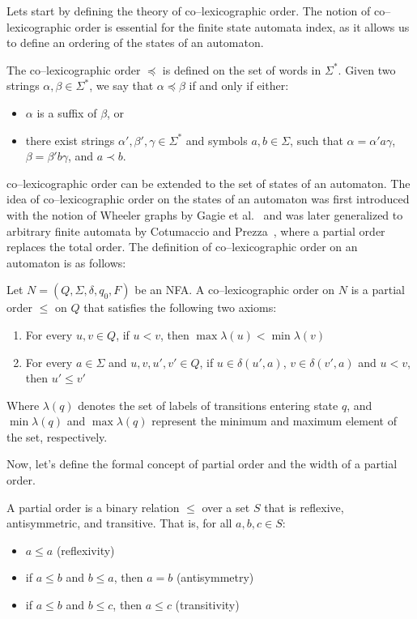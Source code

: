 Lets start by defining the theory of co--lexicographic order. The notion of co--lexicographic order is essential for the finite state automata index, as it allows us to define an ordering of the states of an automaton. 
\begin{definition} 
    The co--lexicographic order $\preceq$ is defined on the set of words in $\Sigma^*$. Given two strings $\alpha, \beta \in \Sigma^*$, we say that $\alpha \preceq \beta$ if and only if either:
    \begin{itemize}
        \item $\alpha$ is a suffix of $\beta$, or
        \item there exist strings $\alpha', \beta', \gamma \in \Sigma^*$ and symbols $a, b \in \Sigma$, such that $\alpha = \alpha'a\gamma$, $\beta = \beta'b\gamma$, and $a \prec b$.
    \end{itemize}
\end{definition}
co--lexicographic order can be extended to the set of states of an automaton. The idea of co--lexicographic order on the states of an automaton was first introduced with the notion of Wheeler graphs by Gagie et al.~\cite{gagie2017wheeler} and was later generalized to arbitrary finite automata by Cotumaccio and Prezza~\cite{cotumaccio2021indexing}, where a partial order replaces the total order. The definition of co--lexicographic order on an automaton is as follows:

\begin{definition} \label{def:colex_order_on_automaton}
    Let $N = (Q, \Sigma, \delta, q_0, F)$ be an NFA. A co--lexicographic order on $N$ is a partial order $\leq$ on $Q$ that satisfies the following two axioms:
    \begin{enumerate}
        \item For every $u, v \in Q$, if $u < v$, then $\max\lambda(u) < \min\lambda(v)$
        \item For every $a \in \Sigma$ and $u, v, u', v' \in Q$, if $u \in \delta(u', a)$, $v \in \delta(v', a)$ and $u < v$, then $u' \leq v'$
    \end{enumerate}
\end{definition}
Where $\lambda(q)$ denotes the set of labels of transitions entering state $q$, and $\min\lambda(q)$ and $\max\lambda(q)$ represent the minimum and maximum element of the set, respectively.

Now, let's define the formal concept of partial order and the width of a partial order. 
\begin{definition}
    A partial order is a binary relation $\leq$ over a set $S$ that is reflexive, antisymmetric, and transitive. That is, for all $a, b, c \in S$:
    \begin{itemize}
        \item $a \leq a$ (reflexivity)
        \item if $a \leq b$ and $b \leq a$, then $a = b$ (antisymmetry)
        \item if $a \leq b$ and $b \leq c$, then $a \leq c$ (transitivity)
    \end{itemize}
\end{definition}

